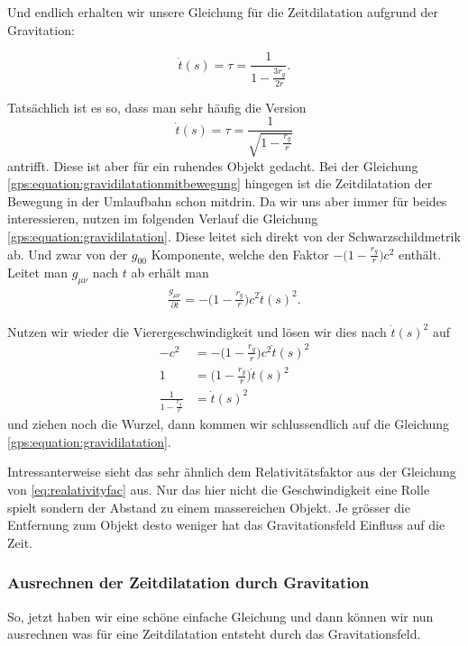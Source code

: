 \begin{refsection}
\noindent{}Und endlich erhalten wir unsere Gleichung für die Zeitdilatation aufgrund der Gravitation:

\begin{equation}
\label{gps:equation:gravidilatation}
\dot t(s) = \tau = \frac{1}{ 1 - \frac{3r_g}{2r} }.
\end{equation}

\noindent{}Tatsächlich ist es so, dass man sehr häufig die Version
\begin{equation}
\label{gps:equation:gravidilatation}
\dot t(s) = \tau = \frac{1}{ \sqrt{1 - \frac{r_g}{r} }}
\end{equation}
\noindent{}antrifft. Diese ist aber für ein ruhendes Objekt gedacht. Bei der Gleichung \eqref{gps:equation:gravidilatationmitbewegung} hingegen ist die Zeitdilatation der Bewegung in der Umlaufbahn  schon mitdrin. Da wir uns aber immer für beides interessieren, nutzen im folgenden Verlauf die Gleichung \eqref{gps:equation:gravidilatation}. Diese leitet sich direkt von der Schwarzschildmetrik ab. Und zwar von der $g_{00}$ Komponente, welche den Faktor $- \biggr( 1-\frac{r_g}{r} \biggr)c^2$ enthält. Leitet man $g_{\mu\nu}$ nach $t$ ab erhält man
\begin{align*}
\frac{g_{\mu\nu}}{\partial t} =  - \biggr( 1-\frac{r_g}{r} \biggr)c^2 \dot t(s)^2.
\end{align*}

\noindent{}Nutzen wir wieder die Vierergeschwindigkeit und lösen wir dies nach $\dot t(s)^2$ auf
\begin{align*}
-c^2 &= - \biggr( 1-\frac{r_g}{r} \biggr)c^2 \dot t(s)^2
\\
1 &= \biggr( 1-\frac{r_g}{r} \biggr) \dot t(s)^2
\\
\frac{1}{ 1-\frac{r_g}{r}} &=  \dot t(s)^2
\end{align*}
\noindent{}und ziehen noch die Wurzel, dann kommen wir schlussendlich auf die Gleichung \eqref{gps:equation:gravidilatation}.

Intressanterweise sieht das sehr ähnlich dem Relativitätsfaktor aus der Gleichung von \ref{eq:realativityfac} aus. Nur das hier nicht die Geschwindigkeit eine Rolle spielt sondern der Abstand zu einem massereichen Objekt. Je grösser die Entfernung zum Objekt desto weniger hat das Gravitationsfeld Einfluss auf die Zeit. 

\subsubsection{Ausrechnen der Zeitdilatation durch Gravitation}
So, jetzt haben wir eine schöne einfache Gleichung und dann können wir nun ausrechnen was für eine Zeitdilatation entsteht durch das Gravitationsfeld.


\end{refsection}
